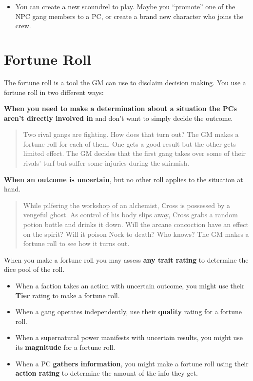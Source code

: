 \documentclass[11pt,fleqn,a5paper]{book}
\begin{document}
\begin{itemize}
	\item You can create a new scoundrel to play. Maybe you “promote” one of the NPC gang members to a PC, or create a brand new character who joins the crew.
\end{itemize}

\chapter{Fortune Roll}

The fortune roll is a tool the GM can use to disclaim decision making. You use a fortune roll in two different ways:

\textbf{When you need to make a determination about a situation the PCs aren’t directly involved in} and don’t want to simply decide the outcome.

\begin{quote}
	Two rival gangs are fighting. How does that turn out? The GM makes a fortune roll for each of them. One gets a good result but the other gets limited effect. The GM decides that the first gang takes over some of their rivals’ turf but suffer some injuries during the skirmish.
\end{quote}

\textbf{When an outcome is uncertain}, but no other roll applies to the situation at hand.

\begin{quote}
	While pilfering the workshop of an alchemist, Cross is possessed by a vengeful ghost. As control of his body slips away, Cross grabs a random potion bottle and drinks it down. Will the arcane concoction have an effect on the spirit? Will it poison Nock to death? Who knows? The GM makes a fortune roll to see how it turns out.
\end{quote}

When you make a fortune roll you may assess \textbf{any trait rating} to determine the dice pool of the roll.

\begin{itemize}
	\item When a faction takes an action with uncertain outcome, you might use their \textbf{Tier} rating to make a fortune roll.
	\item When a gang operates independently, use their \textbf{quality} rating for a fortune roll.
	\item When a supernatural power manifests with uncertain results, you might use its \textbf{magnitude} for a fortune roll.
	\item When a PC \textbf{gathers information}, you might make a fortune roll using their \textbf{action rating} to determine the amount of the info they get.
\end{itemize}
\end{document}
